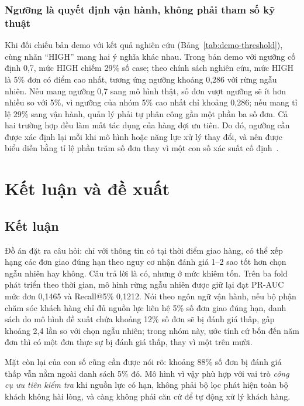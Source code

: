\documentclass[12pt,a4paper]{report}
\begin{document}
\subsection{Ngưỡng là quyết định vận hành, không phải tham số kỹ thuật}

Khi đối chiếu bản demo với kết quả nghiên cứu (Bảng~\ref{tab:demo-threshold}), cùng nhãn ``HIGH'' mang hai ý nghĩa khác nhau. Trong bản demo với ngưỡng cố định 0,7, mức HIGH chiếm 29\% số case; theo chính sách nghiên cứu, mức HIGH là 5\% đơn có điểm cao nhất, tương ứng ngưỡng khoảng 0,286 với rừng ngẫu nhiên. Nếu mang ngưỡng 0,7 sang mô hình thật, số đơn vượt ngưỡng sẽ ít hơn nhiều so với 5\%, vì ngưỡng của nhóm 5\% cao nhất chỉ khoảng 0,286; nếu mang tỉ lệ 29\% sang vận hành, quản lý phải tự phân công gần một phần ba số đơn. Cả hai trường hợp đều làm mất tác dụng của hàng đợi ưu tiên. Do đó, ngưỡng cần được xác định lại mỗi khi mô hình hoặc năng lực xử lý thay đổi, và nên được biểu diễn bằng tỉ lệ phần trăm số đơn thay vì một con số xác suất cố định~\cite{gomezvargas2025}.

\chapter{Kết luận và đề xuất}\label{ch:conclusion}

\section{Kết luận}

Đồ án đặt ra câu hỏi: chỉ với thông tin có tại thời điểm giao hàng, có thể xếp hạng các đơn giao đúng hạn theo nguy cơ nhận đánh giá 1--2 sao tốt hơn chọn ngẫu nhiên hay không. Câu trả lời là có, nhưng ở mức khiêm tốn. Trên ba fold phát triển theo thời gian, mô hình rừng ngẫu nhiên được giữ lại đạt PR-AUC mức đơn 0,1465 và Recall@5\% 0,1212. Nói theo ngôn ngữ vận hành, nếu bộ phận chăm sóc khách hàng chỉ đủ nguồn lực liên hệ 5\% số đơn giao đúng hạn, danh sách do mô hình đề xuất chứa khoảng 12\% số đơn sẽ bị đánh giá thấp, gấp khoảng 2,4 lần so với chọn ngẫu nhiên; trong nhóm này, ước tính cứ bốn đến năm đơn thì có một đơn thực sự bị đánh giá thấp, thay vì một trên mười.

Mặt còn lại của con số cũng cần được nói rõ: khoảng 88\% số đơn bị đánh giá thấp vẫn nằm ngoài danh sách 5\% đó. Mô hình vì vậy phù hợp với vai trò \emph{công cụ ưu tiên kiểm tra} khi nguồn lực có hạn, không phải bộ lọc phát hiện toàn bộ khách không hài lòng, và càng không phải căn cứ để tự động xử lý khách hàng.
\end{document}
